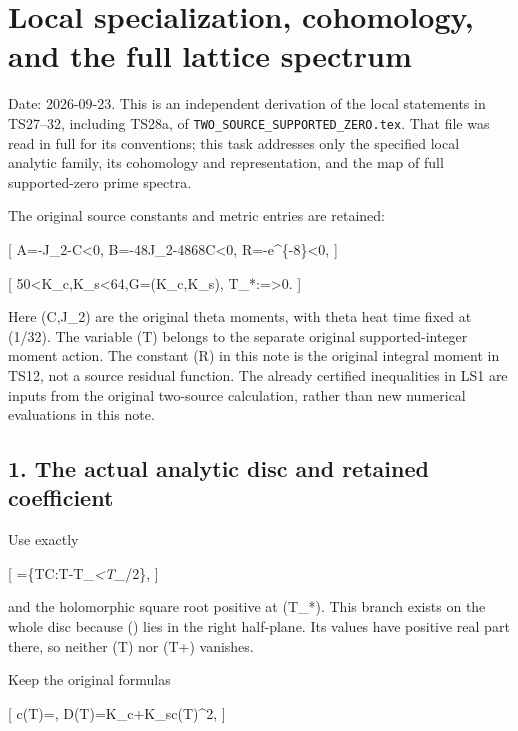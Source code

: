 \documentclass[
]{article}
\author{}
\date{}
\begin{document}
\section{Local specialization, cohomology, and the full lattice
spectrum}\label{local-specialization-cohomology-and-the-full-lattice-spectrum}

Date: 2026-09-23. This is an independent derivation of the local
statements in TS27--32, including TS28a, of
\texttt{TWO\_SOURCE\_SUPPORTED\_ZERO.tex}. That file was read in full
for its conventions; this task addresses only the specified local
analytic family, its cohomology and representation, and the map of full
supported-zero prime spectra.

The original source constants and metric entries are retained:

{[} A=-J\_2-C\textless0,\qquad
B=-48J\_2-4868C\textless0,\qquad
R=-e\^{}\{-8\}\textless0, {]}

{[}
50\textless K\_c,K\_s\textless64,\qquad G=(K\_c,K\_s),
\qquad T\_*:=\textgreater0.  {]}

Here (C,J\_2) are the original theta moments, with theta heat time fixed
at (1/32). The variable (T) belongs to the separate original
supported-integer moment action. The constant (R) in this note is the
original integral moment in TS12, not a source residual function. The
already certified inequalities in LS1 are inputs from the original
two-source calculation, rather than new numerical evaluations in this
note.

\subsection{1. The actual analytic disc and retained
coefficient}\label{the-actual-analytic-disc-and-retained-coefficient}

Use exactly

{[}
\Omega=\{T\in\mathbb C:\textbar T-T\_\emph{\textbar\textless T\_}/2\},
{]}

and the holomorphic square root positive at (T\_*). This branch exists
on the whole disc because (\Omega) lies in the right half-plane. Its
values have positive real part there, so neither (\sqrt T) nor
(\sqrt T+) vanishes.

Keep the original formulas

{[} c(T)=, \qquad D(T)=K\_c+K\_sc(T)\^{}2,
{]}
\end{document}
